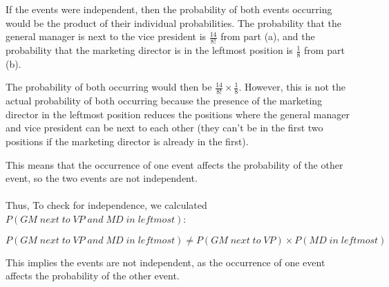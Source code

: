 \documentclass{amsart}
\theoremstyle{definition}
\theoremstyle{Exercise}
\theoremstyle{remark}
\theoremstyle{rule}
\numberwithin{equation}{section}
\begin{document}
\begin{enumerate}[label=(\alph*)]
If the events were independent, then the probability of both events occurring would be the product of their individual probabilities. The probability that the general manager is next to the vice president is \( \frac{14}{8!} \) from part (a), and the probability that the marketing director is in the leftmost position is \( \frac{1}{8} \) from part (b).

The probability of both occurring would then be \( \frac{14}{8!} \times \frac{1}{8} \). However, this is not the actual probability of both occurring because the presence of the marketing director in the leftmost position reduces the positions where the general manager and vice president can be next to each other (they can't be in the first two positions if the marketing director is already in the first).

This means that the occurrence of one event affects the probability of the other event, so the two events are not independent.\\\\
Thus, To check for independence, we calculated \( P(GM \; next \; to \; VP \; and \; MD \; in \; leftmost) \):

\[ P(GM \; next \; to \; VP \; and \; MD \; in \; leftmost) \neq P(GM \; next \; to \; VP) \times P(MD \; in \; leftmost) \]

This implies the events are not independent, as the occurrence of one event affects the probability of the other event.\\
\end{enumerate}
\end{document}
